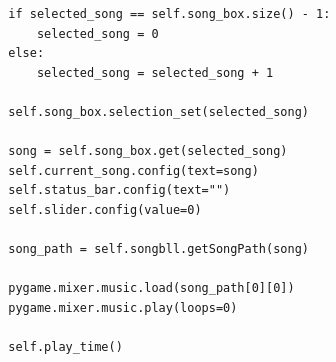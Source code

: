 \documentclass[a4paper]{article}
\begin{document}
\begin{mdframed}[hidealllines=true,backgroundcolor=magenta!10]
\begin{lstlisting}
        if selected_song == self.song_box.size() - 1:
            selected_song = 0
        else:
            selected_song = selected_song + 1

        self.song_box.selection_set(selected_song)

        song = self.song_box.get(selected_song)
        self.current_song.config(text=song)
        self.status_bar.config(text="")
        self.slider.config(value=0)

        song_path = self.songbll.getSongPath(song)

        pygame.mixer.music.load(song_path[0][0])
        pygame.mixer.music.play(loops=0)

        self.play_time()

\end{lstlisting}
\end{mdframed}
\end{document}
